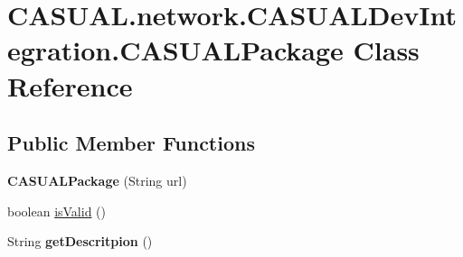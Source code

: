 \hypertarget{class_c_a_s_u_a_l_1_1network_1_1_c_a_s_u_a_l_dev_integration_1_1_c_a_s_u_a_l_package}{\section{C\-A\-S\-U\-A\-L.\-network.\-C\-A\-S\-U\-A\-L\-Dev\-Integration.\-C\-A\-S\-U\-A\-L\-Package Class Reference}
\label{class_c_a_s_u_a_l_1_1network_1_1_c_a_s_u_a_l_dev_integration_1_1_c_a_s_u_a_l_package}
}
\subsection*{Public Member Functions}
\begin{DoxyCompactItemize}
\item 
\hypertarget{class_c_a_s_u_a_l_1_1network_1_1_c_a_s_u_a_l_dev_integration_1_1_c_a_s_u_a_l_package_a128d420165fc6a6e1c483f951dc0b003}{{\bfseries C\-A\-S\-U\-A\-L\-Package} (String url)}\label{class_c_a_s_u_a_l_1_1network_1_1_c_a_s_u_a_l_dev_integration_1_1_c_a_s_u_a_l_package_a128d420165fc6a6e1c483f951dc0b003}

\item 
boolean \hyperlink{class_c_a_s_u_a_l_1_1network_1_1_c_a_s_u_a_l_dev_integration_1_1_c_a_s_u_a_l_package_a6b0e9fe30f79ee7e2ff1b06fd2f1a016}{is\-Valid} ()
\item 
\hypertarget{class_c_a_s_u_a_l_1_1network_1_1_c_a_s_u_a_l_dev_integration_1_1_c_a_s_u_a_l_package_a62b7d7fa76822fd2ffcad98848715d21}{String {\bfseries get\-Descritpion} ()}\label{class_c_a_s_u_a_l_1_1network_1_1_c_a_s_u_a_l_dev_integration_1_1_c_a_s_u_a_l_package_a62b7d7fa76822fd2ffcad98848715d21}


\end{DoxyCompactItemize}

